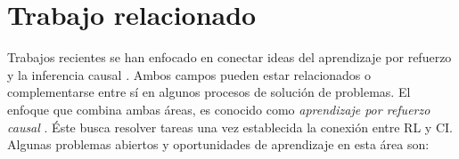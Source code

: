 \chapter{Trabajo relacionado}\label{chapter3}

\graphicspath{{Chapter3/Figs/}}


Trabajos recientes
se han enfocado en conectar ideas del aprendizaje por refuerzo y la inferencia causal
\cite{Gershman2017, 6-DBLP:journals/midm/YuDLR19, lu2018deconfounding, dasgupta2019causal}. Ambos campos
pueden estar relacionados o complementarse entre sí en algunos procesos de solución de problemas. 
El enfoque que combina ambas áreas, es conocido como
\textit{aprendizaje por refuerzo causal} \cite{CausalRL2019EliasB, chaochao_2019}. Éste busca resolver tareas una vez establecida la conexión entre RL y CI.
Algunas problemas abiertos y oportunidades de aprendizaje en esta área son: 


